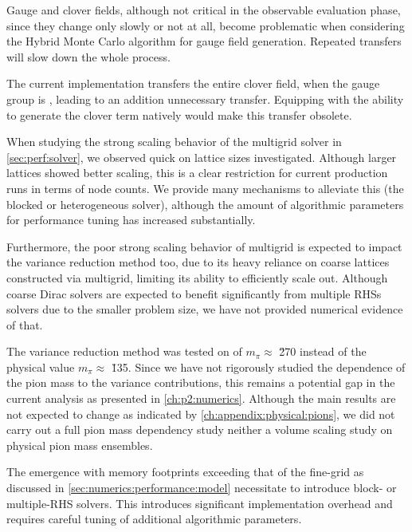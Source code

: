 Gauge and clover fields, although not critical in the observable evaluation phase, since they change only slowly or not at all, become problematic when considering the Hybrid Monte Carlo algorithm for gauge field generation.
Repeated transfers will slow down the whole process.

The current implementation transfers the entire clover field, when the gauge group is , leading to an addition unnecessary transfer.
Equipping \quda with the ability to generate the  clover term natively would make this transfer obsolete.

When studying the strong scaling behavior of the multigrid solver in \cref{sec:perf:solver}, we observed quick  on lattice sizes investigated.
Although larger lattices showed better scaling, this is a clear restriction for current production runs in terms of node counts.
We provide many mechanisms to alleviate this (the blocked or heterogeneous solver), although the amount of algorithmic parameters for performance tuning has increased substantially.

Furthermore, the poor strong scaling behavior of multigrid is expected to impact the variance reduction method too, due to its heavy reliance on coarse lattices constructed via multigrid, limiting its ability to efficiently scale out.
Although coarse Dirac solvers are expected to benefit significantly from multiple RHSs solvers due to the smaller problem size, we have not provided numerical evidence of that.

The variance reduction method was tested on  of $m_{\pi} \approx $ \u{270}{\MeV} instead of the physical value $m_{\pi} \approx $ \u{135}{\MeV}.
Since we have not rigorously studied the dependence of the pion mass
to the variance contributions,
this remains a potential gap in the current analysis as presented in \cref{ch:p2:numerics}.
Although the main results are not expected to change as indicated by \cref{ch:appendix:physical:pions}, we did not carry out a full pion mass dependency study neither a volume scaling study on physical pion mass ensembles.

The emergence  with memory footprints exceeding that of the fine-grid as discussed in \cref{sec:numerics:performance:model} necessitate to introduce block- or multiple-RHS solvers.
This introduces significant implementation overhead and requires careful tuning of additional algorithmic parameters.


